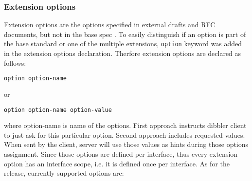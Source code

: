 \subsubsection{Extension options}
Extension options are the options specified in external drafts and RFC
documents, but not in the base spec \cite{rfc3315}. To easily
distinguish if an option is part of the base standard or one of the
multiple extensions, \verb+option+ keyword was added in the extension
options declaration. Therfore extension options are declared as follows:

\begin{verbatim}
option option-name
\end{verbatim}

or

\begin{verbatim}
option option-name option-value
\end{verbatim}

where option-name is name of the options. First approach instructs
dibbler client to just ask for this particular option. Second approach
includes requested values. When sent by the client, server will use
those values as hints during those options assignment. Since those
options are defined per interface, thus every extension option has an
interface scope, i.e. it is defined once per interface. As for the
\version release, currently supported options are:

